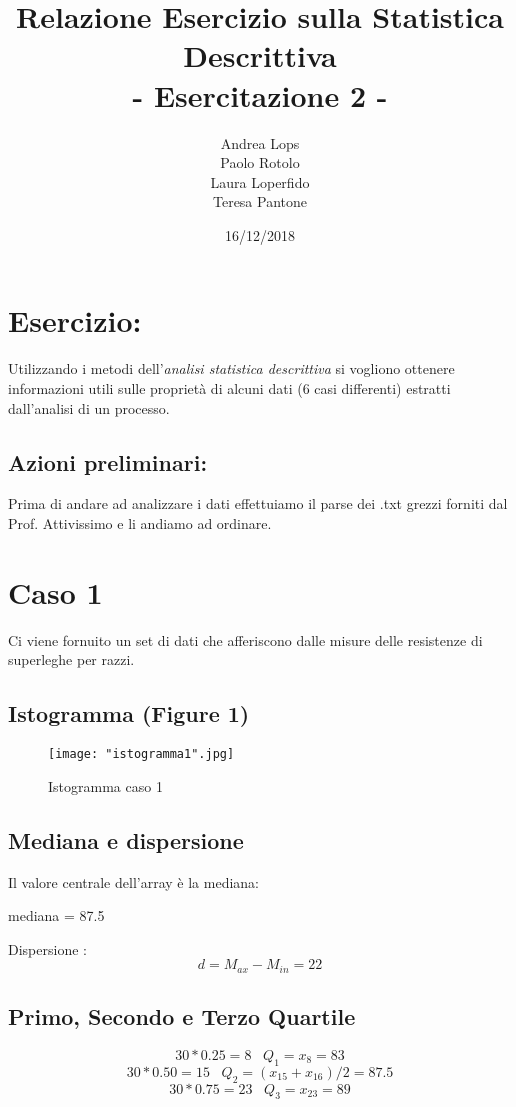 \documentclass[a4paper]{article}
\title{\textbf{Relazione Esercizio sulla Statistica Descrittiva}\\{\normalsize - Esercitazione 2 -}}
\author{Andrea Lops\\
		Paolo Rotolo\\
		Laura Loperfido\\
		Teresa Pantone
	   }
\date{16/12/2018}
\begin{document}
\maketitle

\section{Esercizio:}
Utilizzando i metodi dell’\emph{analisi statistica descrittiva} si vogliono ottenere informazioni utili
sulle proprietà di alcuni dati (6 casi differenti) estratti dall’analisi di un processo.
\subsection {Azioni preliminari:}

Prima di andare ad analizzare i dati effettuiamo il parse dei .txt grezzi forniti dal Prof. Attivissimo e li andiamo ad ordinare.


\section{Caso 1}
Ci viene fornuito un set di dati che afferiscono dalle misure delle resistenze di superleghe per razzi.
\subsection{Istogramma (Figure 1)}
\begin{figure}[htp]
	\centering
	\texttt{[image: "istogramma1".jpg]}
	\caption{Istogramma caso 1}
	\label{}
\end{figure}

\subsection{Mediana e dispersione}
Il valore centrale dell'array è la mediana:
\begin{center}
	mediana = 87.5
\end{center}
Dispersione :
\begin{equation}
	d=M_{ax}-M_{in}=22
\end{equation}
\subsection{Primo, Secondo e Terzo Quartile}
\begin{equation}
	30*0.25= 8 \; \; \; Q_1=x_8=83
\end{equation}
\begin{equation}
	30*0.50= 15 \; \; \;  Q_2=(x_{15}+x_{16})/2=87.5
\end{equation}
\begin{equation}
	30*0.75= 23 \; \; \;  Q_3=x_{23}=89
\end{equation}
\end{document}
